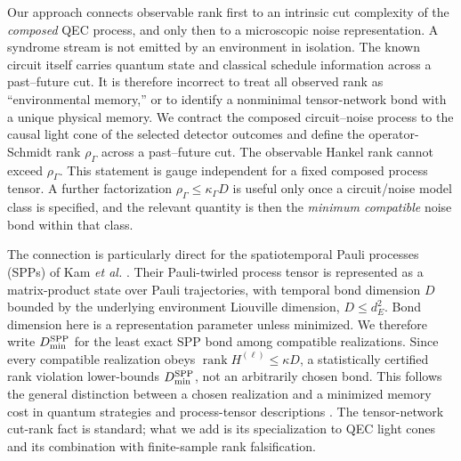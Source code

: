 \documentclass[11pt]{article}
\newcommand{\rank}{\operatorname{rank}}
\begin{document}
Our approach connects observable rank first to an intrinsic cut complexity of the \emph{composed} QEC process, and only then to a microscopic noise representation. A syndrome stream is not emitted by an environment in isolation. The known circuit itself carries quantum state and classical schedule information across a past--future cut. It is therefore incorrect to treat all observed rank as ``environmental memory,'' or to identify a nonminimal tensor-network bond with a unique physical memory. We contract the composed circuit--noise process to the causal light cone of the selected detector outcomes and define the operator-Schmidt rank $\rho_\Gamma$ across a past--future cut. The observable Hankel rank cannot exceed $\rho_\Gamma$. This statement is gauge independent for a fixed composed process tensor. A further factorization $\rho_\Gamma\le\kappa_\Gamma D$ is useful only once a circuit/noise model class is specified, and the relevant quantity is then the \emph{minimum compatible} noise bond within that class.

The connection is particularly direct for the spatiotemporal Pauli processes (SPPs) of Kam \emph{et al.} \cite{kam2026spp}. Their Pauli-twirled process tensor is represented as a matrix-product state over Pauli trajectories, with temporal bond dimension $D$ bounded by the underlying environment Liouville dimension, $D\le d_E^2$. Bond dimension here is a representation parameter unless minimized. We therefore write $D_{\min}^{\rm SPP}$ for the least exact SPP bond among compatible realizations. Since every compatible realization obeys $\rank H^{(\ell)}\le\kappa D$, a statistically certified rank violation lower-bounds $D_{\min}^{\rm SPP}$, not an arbitrarily chosen bond. This follows the general distinction between a chosen realization and a minimized memory cost in quantum strategies and process-tensor descriptions \cite{bisio2011memory,guo2022memory}. The tensor-network cut-rank fact is standard; what we add is its specialization to QEC light cones and its combination with finite-sample rank falsification.
\end{document}
